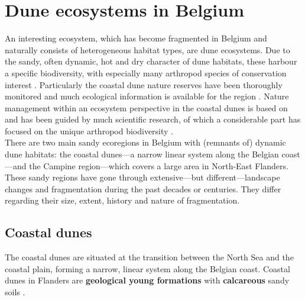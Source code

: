 \documentclass[10pt, twoside]{book} %
\begin{document}
	\section{Dune ecosystems in Belgium}
	An interesting ecosystem, which has become fragmented in Belgium and naturally consists of heterogeneous habitat types, are dune ecosystems. Due to the sandy, often dynamic, hot and dry character of dune habitats, these harbour a specific biodiversity, with especially many arthropod species of conservation interest \citep{maes2006, provoost2011, dero2021}. Particularly the coastal dune nature reserves have been thoroughly monitored and much ecological information is available for the region \citep{provoost2004a, provoost2020a}. Nature management within an ecosystem perspective in the coastal dunes is based on and has been guided by much scientific research, of which a considerable part has focused on the unique arthropod biodiversity \citep[e.g.][]{bonte2002, bonte2005, maes2006a, maes2006, dhondt2008, vandegehuchte2010, dero2021}.\\
	
	There are two main sandy ecoregions in Belgium with (remnants of) dynamic dune habitats: the coastal dunes---a narrow linear system along the Belgian coast---and the Campine region---which covers a large area in North-East Flanders. These sandy regions have gone through extensive---but different---landscape changes and fragmentation during the past decades or centuries. They differ regarding their size, extent, history and nature of fragmentation.\\
	
	\subsection{Coastal dunes}
	The coastal dunes are situated at the transition between the North Sea and the coastal plain, forming a narrow, linear system along the Belgian coast. Coastal dunes in Flanders are \textbf{geological young formations} with \textbf{calcareous} sandy soils \citep{provoost2004, decleer2007}.\\
	
\end{document}

